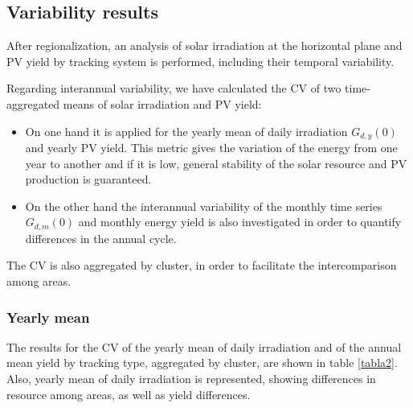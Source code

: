 \subsection{Variability results}

After regionalization, an analysis of solar irradiation at the horizontal plane and PV yield by tracking system is performed, including their temporal variability.

Regarding interannual variability, we have calculated the CV of two time-aggregated means of solar irradiation and PV yield:

\begin{itemize}
\item On one hand it is applied for the yearly mean of daily irradiation $G_{d,y}(0)$ and yearly PV yield. This metric gives the variation of the energy from one year to another and if it is low, general stability of the solar resource and PV production is guaranteed. 
\item On the other hand the interannual variability of the monthly time series $G_{d,m}(0)$ and monthly energy yield is also investigated in order to quantify differences in the annual cycle. 
\end{itemize}

The CV is also aggregated by cluster, in order to facilitate the intercomparison among areas.



\subsubsection{Yearly mean}

The results for the CV of the yearly mean of daily irradiation and of the annual mean yield by tracking type, aggregated by cluster, are shown in table \ref{tabla2}. Also, yearly mean of daily irradiation is represented, showing differences in resource among areas, as well as yield differences.

